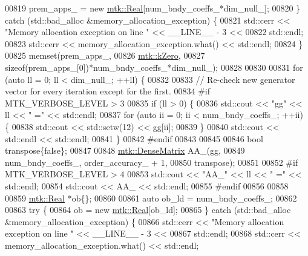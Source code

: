 \begin{DoxyCode}
{{00819     prem\_apps\_ = \textcolor{keyword}{new} \hyperlink{group__c01-roots_gac080bbbf5cbb5502c9f00405f894857d}{mtk::Real}[num\_bndy\_coeffs\_*dim\_null\_];
00820   \} \textcolor{keywordflow}{catch} (std::bad\_alloc &memory\_allocation\_exception) \{
00821     std::cerr << \textcolor{stringliteral}{"Memory allocation exception on line "} << \_\_LINE\_\_ - 3 <<
00822       std::endl;
00823     std::cerr << memory\_allocation\_exception.what() << std::endl;
00824   \}
00825   memset(prem\_apps\_,
00826          \hyperlink{group__c01-roots_ga59a451a5fae30d59649bcda274fea271}{mtk::kZero},
00827          \textcolor{keyword}{sizeof}(prem\_apps\_[0])*num\_bndy\_coeffs\_*dim\_null\_);
00828 
00830 
00831   \textcolor{keywordflow}{for} (\textcolor{keyword}{auto} ll = 0; ll < dim\_null\_; ++ll) \{
00832 
00833     \textcolor{comment}{// Re-check new generator vector for every iteration except for the first.}
00834 \textcolor{preprocessor}{    #if MTK\_VERBOSE\_LEVEL > 3}
00835     \textcolor{keywordflow}{if} (ll > 0) \{
00836       std::cout << \textcolor{stringliteral}{"gg"} << ll << \textcolor{stringliteral}{" ="} << std::endl;
00837       \textcolor{keywordflow}{for} (\textcolor{keyword}{auto} ii = 0; ii < num\_bndy\_coeffs\_; ++ii) \{
00838         std::cout << std::setw(12) << gg[ii];
00839       \}
00840       std::cout << std::endl << std::endl;
00841     \}
00842 \textcolor{preprocessor}{    #endif}
00843 
00845 
00846     \textcolor{keywordtype}{bool} transpose\{\textcolor{keyword}{false}\};
00847 
00848     \hyperlink{classmtk_1_1DenseMatrix}{mtk::DenseMatrix} AA\_(gg,
00849                          num\_bndy\_coeffs\_, order\_accuracy\_ + 1,
00850                          transpose);
00851 
00852 \textcolor{preprocessor}{    #if MTK\_VERBOSE\_LEVEL > 4}
00853     std::cout << \textcolor{stringliteral}{"AA\_"} << ll << \textcolor{stringliteral}{" ="} << std::endl;
00854     std::cout << AA\_ << std::endl;
00855 \textcolor{preprocessor}{    #endif}
00856 
00858 
00859     \hyperlink{group__c01-roots_gac080bbbf5cbb5502c9f00405f894857d}{mtk::Real} *ob\{\};
00860 
00861     \textcolor{keyword}{auto} ob\_ld = num\_bndy\_coeffs\_;
00862 
00863     \textcolor{keywordflow}{try} \{
00864       ob = \textcolor{keyword}{new} \hyperlink{group__c01-roots_gac080bbbf5cbb5502c9f00405f894857d}{mtk::Real}[ob\_ld];
00865     \} \textcolor{keywordflow}{catch} (std::bad\_alloc &memory\_allocation\_exception) \{
00866       std::cerr << \textcolor{stringliteral}{"Memory allocation exception on line "} << \_\_LINE\_\_ - 3 <<
00867         std::endl;
00868       std::cerr << memory\_allocation\_exception.what() << std::endl;
}}
\end{DoxyCode}

